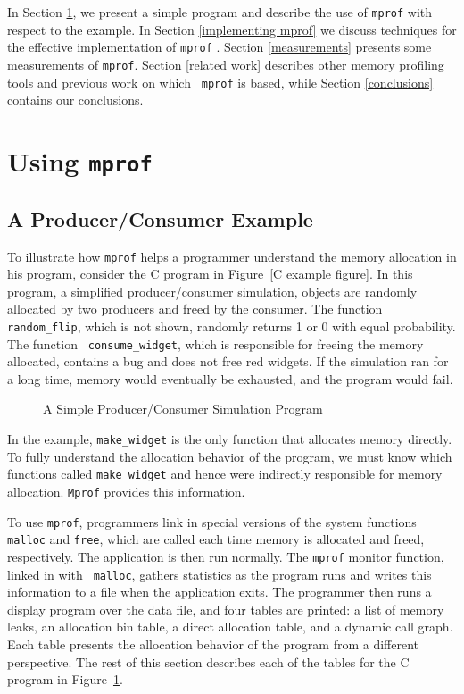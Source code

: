 In Section \ref{using mprof}, we present a simple program and
describe the use of {\tt mprof} with respect to the example. In
Section \ref{implementing mprof} we discuss techniques for the
effective implementation of {\tt mprof} .  Section \ref{measurements}
presents some measurements of {\tt mprof}.  Section \ref{related work}
describes other memory profiling tools and previous work on which {\tt
mprof} is based, while Section \ref{conclusions} contains our
conclusions.

\section{Using {\tt mprof}}
\label{using mprof}

\subsection{A Producer/Consumer Example}

To illustrate how {\tt mprof} helps a programmer understand the memory
allocation in his program, consider the C program in Figure~\ref{C
example figure}.  In this program, a simplified producer/consumer
simulation, objects are randomly allocated by two producers and freed
by the consumer.  The function {\tt random\_flip}, which is not shown,
randomly returns 1 or 0 with equal probability.  The function {\tt
consume\_widget}, which is responsible for freeing the memory
allocated, contains a bug and does not free red widgets.  If the
simulation ran for a long time, memory would eventually be exhausted,
and the program would fail.

\begin{figure}[htbp]
\begin{singlespace}
{\footnotesize

}
\end{singlespace}
\caption{A Simple Producer/Consumer Simulation Program}
\label{C example figure}
\end{figure}

In the example, {\tt make\_widget} is the only function that allocates
memory directly.  To fully understand the allocation behavior of the
program, we must know which functions called {\tt make\_widget} and
hence were indirectly responsible for memory allocation.  {\tt Mprof}
provides this information.

To use {\tt mprof}, programmers link in special versions of the system
functions {\tt malloc} and {\tt free}, which are called each time
memory is allocated and freed, respectively.  The application is then
run normally.  The {\tt mprof} monitor function, linked in with {\tt
malloc}, gathers statistics as the program runs and writes this
information to a file when the application exits.  The programmer then
runs a display program over the data file, and four tables are
printed: a list of memory leaks, an allocation bin table, a direct
allocation table, and a dynamic call graph.  Each table presents the
allocation behavior of the program from a different perspective.  The
rest of this section describes each of the tables for the C program in
Figure~\ref{C example figure}.

